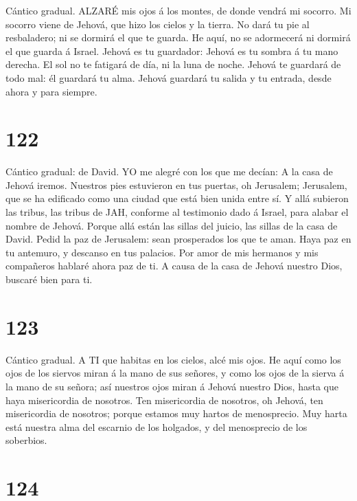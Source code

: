  Cántico gradual. ALZARÉ mis ojos á los montes, de donde
vendrá mi socorro.  Mi socorro viene de Jehová, que hizo los
cielos y la tierra.  No dará tu pie al resbaladero; ni se
dormirá el que te guarda.  He aquí, no se adormecerá ni
dormirá el que guarda á Israel.  Jehová es tu guardador:
Jehová es tu sombra á tu mano derecha.  El sol no te
fatigará de día, ni la luna de noche.  Jehová te guardará de
todo mal: él guardará tu alma.  Jehová guardará tu salida y
tu entrada, desde ahora y para siempre.

\hypertarget{section-121}{%
\section{122}\label{section-121}}

 Cántico gradual: de David. YO me alegré con los que me
decían: A la casa de Jehová iremos.  Nuestros pies
estuvieron en tus puertas, oh Jerusalem;  Jerusalem, que se
ha edificado como una ciudad que está bien unida entre sí. 
Y allá subieron las tribus, las tribus de JAH, conforme al testimonio
dado á Israel, para alabar el nombre de Jehová.  Porque allá
están las sillas del juicio, las sillas de la casa de David.
 Pedid la paz de Jerusalem: sean prosperados los que te
aman.  Haya paz en tu antemuro, y descanso en tus palacios.
 Por amor de mis hermanos y mis compañeros hablaré ahora paz
de ti.  A causa de la casa de Jehová nuestro Dios, buscaré
bien para ti.

\hypertarget{section-122}{%
\section{123}\label{section-122}}

 Cántico gradual. A TI que habitas en los cielos, alcé mis
ojos.  He aquí como los ojos de los siervos miran á la mano
de sus señores, y como los ojos de la sierva á la mano de su señora; así
nuestros ojos miran á Jehová nuestro Dios, hasta que haya misericordia
de nosotros.  Ten misericordia de nosotros, oh Jehová, ten
misericordia de nosotros; porque estamos muy hartos de menosprecio.
 Muy harta está nuestra alma del escarnio de los holgados, y
del menosprecio de los soberbios.

\hypertarget{section-123}{%
\section{124}\label{section-123}}

